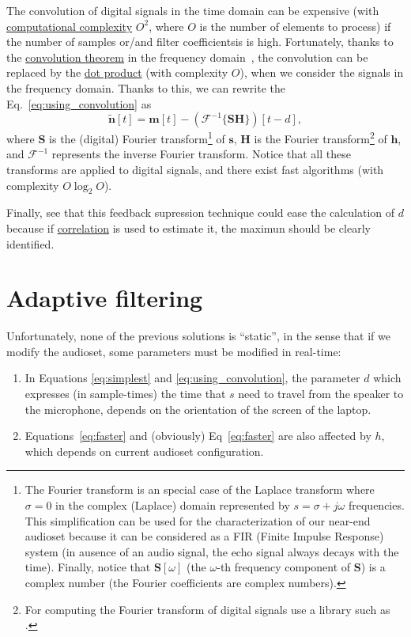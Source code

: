 The convolution of digital signals in the time domain can be expensive
(with
\href{https://en.wikipedia.org/wiki/Computational_complexity_theory}{computational
  complexity} $O^2$, where $O$ is the number of elements to process)
if the number of samples or/and filter coefficientsis is
high. Fortunately, thanks to the
\href{https://en.wikipedia.org/wiki/Convolution}{convolution theorem}
in the frequency
domain~\cite{kovacevic2013fourier,Oppenheim2}, the convolution can be
replaced by the \href{https://en.wikipedia.org/wiki/Dot_product}{dot
  product} (with complexity $O$), when we consider the signals in the
frequency domain. Thanks to this, we can rewrite the
Eq.~\eqref{eq:using_convolution} as
\begin{equation}
  \tilde{\mathbf n}[t] = {\mathbf m}[t] - ({\mathcal F}^{-1}\{{\mathbf S}{\mathbf H}\})[t-d],
  \label{eq:faster}
\end{equation}
where ${\mathbf S}$ is the (digital) Fourier transform\footnote{The
  Fourier transform is an special case of the Laplace transform where
  $\sigma=0$ in the complex (Laplace) domain represented by
  $s=\sigma+j\omega$ frequencies. This simplification can be used for
  the characterization of our near-end audioset because it can be
  considered as a FIR (Finite Impulse Response) system (in ausence of
  an audio signal, the echo signal always decays with the
  time). Finally, notice that ${\mathbf S}[\omega]$ (the $\omega$-th
  frequency component of ${\mathbf S}$) is a complex number (the
  Fourier coefficients are complex numbers).} of ${\mathbf s}$,
${\mathbf H}$ is the Fourier transform\footnote{For computing the
  Fourier transform of digital signals use a library such as
  \href{https://numpy.org/doc/2.1/reference/routines.fft.html}{}.}
of ${\mathbf h}$, and ${\mathcal F}^{-1}$ represents the inverse
Fourier transform. Notice that all these transforms are applied to
digital signals, and there exist fast algorithms (with complexity
$O\log_2O$).

Finally, see that this feedback supression technique could ease the
calculation of $d$ because if \href{https://en.wikipedia.org/wiki/Correlation}{correlation} is used to estimate it, the
maximun should be clearly identified.

\section{Adaptive filtering}
Unfortunately, none of the previous solutions is ``static'', in the
sense that if we modify the audioset, some parameters must be modified
in real-time:
\begin{enumerate}
\item In Equations \eqref{eq:simplest} and
  \eqref{eq:using_convolution}, the parameter $d$ which expresses (in
  sample-times) the time that $s$ need to travel from the speaker to
  the microphone, depends on the orientation of the screen of the
  laptop.
\item Equations~\eqref{eq:faster} and (obviously) Eq~\eqref{eq:faster}
  are also affected by $h$, which depends on current audioset
  configuration.
\end{enumerate}

